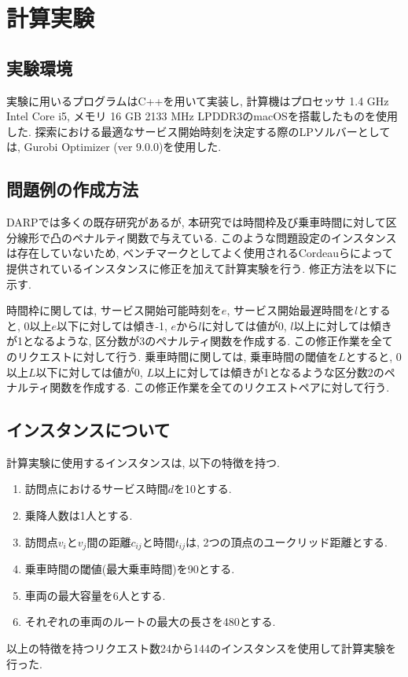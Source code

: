 \chapter{計算実験}\label{computational_result}
\section{実験環境}
実験に用いるプログラムはC++を用いて実装し, 計算機はプロセッサ 1.4 GHz Intel Core i5, メモリ 16 GB 2133 MHz LPDDR3のmacOSを搭載したものを使用した. 探索における最適なサービス開始時刻を決定する際のLPソルバーとしては, Gurobi Optimizer (ver 9.0.0)を使用した.

\section{問題例の作成方法}
DARPでは多くの既存研究があるが, 本研究では時間枠及び乗車時間に対して区分線形で凸のペナルティ関数で与えている. このような問題設定のインスタンスは存在していないため, ベンチマークとしてよく使用されるCordeauらによって提供されている\cite{tabu}インスタンスに修正を加えて計算実験を行う. 修正方法を以下に示す.

時間枠に関しては, サービス開始可能時刻を$e$, サービス開始最遅時間を$l$とすると, 0以上$e$以下に対しては傾き-1, $e$から$l$に対しては値が0, $l$以上に対しては傾きが1となるような, 区分数が3のペナルティ関数を作成する. この修正作業を全てのリクエストに対して行う. 乗車時間に関しては, 乗車時間の閾値を$L$とすると, 0以上$L$以下に対しては値が0, $L$以上に対しては傾きが1となるような区分数2のペナルティ関数を作成する. この修正作業を全てのリクエストペアに対して行う.
\section{インスタンスについて}
計算実験に使用するインスタンスは, 以下の特徴を持つ.
\begin{enumerate}
 \item 訪問点におけるサービス時間$d$を10とする.
 \item 乗降人数は1人とする.
 \item 訪問点$v_i$と$v_j$間の距離$c_{ij}$と時間$t_{ij}$は, 2つの頂点のユークリッド距離とする.
 \item 乗車時間の閾値(最大乗車時間)を90とする.
 \item 車両の最大容量を6人とする.
 \item それぞれの車両のルートの最大の長さを480とする.
\end{enumerate}
以上の特徴を持つリクエスト数24から144のインスタンスを使用して計算実験を行った.
